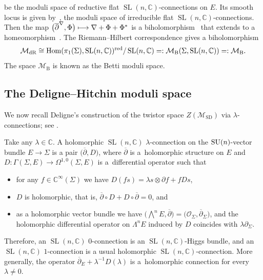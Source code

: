 \documentclass[pdftex]{sigma}
\numberwithin{equation}{section}
\theoremstyle{definition}
\newcommand\C{{\mathbb C}}
\begin{document}
be the moduli space of reductive flat $\operatorname{SL}(n,\C)$-connections on $E$. Its smooth locus is given
by~, the moduli space of irreducible flat $\operatorname{SL}(n,\C)$-connections. Then the
map $\smash{\bigl(\overline{\partial}^\nabla, \Phi\bigr) }\longmapsto \nabla+\Phi+\Phi^*$ is a biholomorphism~
that extends to a homeomorphism~.
The Riemann--Hilbert correspondence gives a biholomorphism
\[%
\mathcal{M}_{\mathrm{dR}} \cong {\rm Hom}(\pi_1(\Sigma), \operatorname{SL}(n,\C))^{\mathrm{red}}/\operatorname{SL}(n,\C) =:
 \mathcal{M}_{\mathrm{B}}(\Sigma,\operatorname{SL}(n,\C)) =: \mathcal{M}_{\mathrm{B}}.
\]
The space $\mathcal{M}_{\mathrm{B}}$ is known as the Betti moduli space.

\subsection{The Deligne--Hitchin moduli space}

We now recall Deligne's construction of the twistor space $Z(\mathcal{M}_{\mathrm{SD}})$ via $\lambda$-connections;
see \cite{Si-Hodge}.

Take any $\lambda \in \mathbb C$. A holomorphic $\operatorname{SL}(n,\C)$ $\lambda$-connection on the
${\rm SU}(n)$-vector bundle $E \longrightarrow
\Sigma$ is a pair $\bigl(\overline{\partial}, D\bigr)$, where $\overline{\partial}$ is a~holomorphic
structure on $E$ and $D\colon \Gamma(\Sigma,E) \longrightarrow \Omega^{1,0}(\Sigma,E)$ is a~differential
operator such that
\begin{itemize}\itemsep=0pt
\item for any $f\in \C^\infty(\Sigma)$ we have $D(fs) = \lambda s\otimes \partial f + fDs$,

\item $D$ is holomorphic, that is, $\overline{\partial}\circ D + D\circ\overline{\partial} = 0$, and

\item as a holomorphic vector bundle we have $\bigl(\bigwedge^n E, \overline{\partial}\bigr) =
\bigl({\mathcal O}_\Sigma, \overline{\partial}_\Sigma\bigr)$, and the holomorphic differential
operator on $\Lambda^n E$ induced by $D$ coincides with $\lambda\partial_\Sigma$.
\end{itemize}
Therefore, an $\operatorname{SL}(n,\C)$ $0$-connection is an $\operatorname{SL}(n,\C)$-Higgs bundle, and an
$\operatorname{SL}(n,\C)$ $1$-connection is a usual holomorphic $\operatorname{SL}(n,\C)$-connection. More
generally, the operator $\overline{\partial}_E + \lambda^{-1}D(\lambda)$ is a~holomorphic
connection for every $\lambda \neq 0$.
\end{document}
